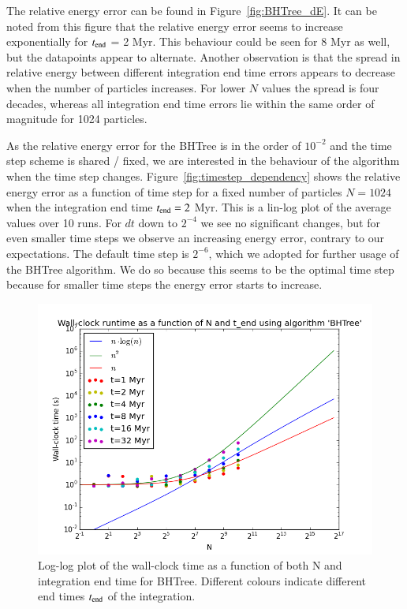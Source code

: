 \documentclass{aa}
\begin{document}
The relative energy error can be found in Figure~\ref{fig:BHTree_dE}. It can be noted from this figure that the relative energy error seems to increase exponentially for $t_{\rm end}$ = 2 Myr. This behaviour could be seen for 8 Myr as well, but the datapoints appear to alternate. Another observation is that the spread in relative energy between different integration end time errors appears to decrease when the number of particles increases. For lower $N$ values the spread is four decades, whereas all integration end time errors lie within the same order of magnitude for 1024 particles.

As the relative energy error for the BHTree is in the order of $10^{-2}$ and the time step scheme is shared / fixed, we are interested in the behaviour of the algorithm when the time step changes. Figure~\ref{fig:timestep_dependency} shows the relative energy error as a function of time step for a fixed number of particles $N = 1024$ when the integration end time $t_{\rm end} = 2$ Myr. This is a lin-log plot of the average values over 10 runs. For $dt$ down to $2^{-4}$ we see no significant changes, but for even smaller time steps we observe an increasing energy error, contrary to our expectations. The default time step is $2^{-6}$, which we adopted for further usage of the BHTree algorithm. We do so because this seems to be the optimal time step because for smaller time steps the energy error starts to increase.
  
   \begin{figure}
   \centering
   \includegraphics[width=\hsize]{img/CA_GD_TLRH_s1603221_SS_s1617451_BHTree_runtime_log_plus_O.png}
      \caption{Log-log plot of the wall-clock time as a function of both N and integration 
               end time for BHTree. Different colours indicate different end times $t_{\rm end}$ of the integration.
              }
         \label{fig:BHTree_runtime}
   \end{figure}
   
\end{document}
